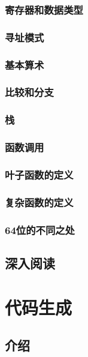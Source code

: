 \documentclass[cn,11pt,chinese]{elegantbook}
\begin{document}
\subsection{寄存器和数据类型}

\subsection{寻址模式}

\subsection{基本算术}

\subsection{比较和分支}

\subsection{栈}

\subsection{函数调用}

\subsection{叶子函数的定义}

\subsection{复杂函数的定义}

\subsection{64位的不同之处}

\section{深入阅读}

\chapter{代码生成}

\section{介绍}
\end{document}
